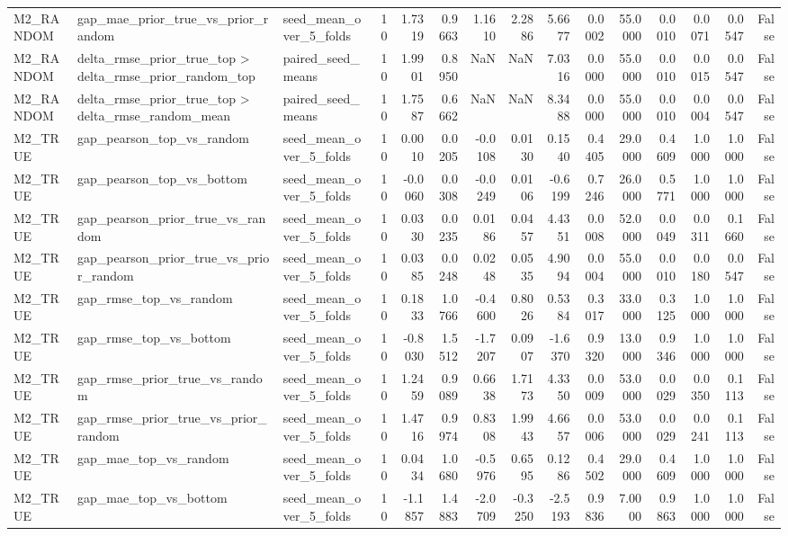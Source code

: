 \begin{tabular}{lllrrrrrrrrrrrr}
M2_RANDOM & gap_mae_prior_true_vs_prior_random & seed_mean_over_5_folds & 10 & 1.7319 & 0.9663 & 1.1610 & 2.2886 & 5.6677 & 0.0002 & 55.0000 & 0.0010 & 0.0071 & 0.0547 & False \\
M2_RANDOM & delta_rmse_prior_true_top > delta_rmse_prior_random_top & paired_seed_means & 10 & 1.9901 & 0.8950 & NaN & NaN & 7.0316 & 0.0000 & 55.0000 & 0.0010 & 0.0015 & 0.0547 & False \\
M2_RANDOM & delta_rmse_prior_true_top > delta_rmse_random_mean & paired_seed_means & 10 & 1.7587 & 0.6662 & NaN & NaN & 8.3488 & 0.0000 & 55.0000 & 0.0010 & 0.0004 & 0.0547 & False \\
M2_TRUE & gap_pearson_top_vs_random & seed_mean_over_5_folds & 10 & 0.0010 & 0.0205 & -0.0108 & 0.0130 & 0.1540 & 0.4405 & 29.0000 & 0.4609 & 1.0000 & 1.0000 & False \\
M2_TRUE & gap_pearson_top_vs_bottom & seed_mean_over_5_folds & 10 & -0.0060 & 0.0308 & -0.0249 & 0.0106 & -0.6199 & 0.7246 & 26.0000 & 0.5771 & 1.0000 & 1.0000 & False \\
M2_TRUE & gap_pearson_prior_true_vs_random & seed_mean_over_5_folds & 10 & 0.0330 & 0.0235 & 0.0186 & 0.0457 & 4.4351 & 0.0008 & 52.0000 & 0.0049 & 0.0311 & 0.1660 & False \\
M2_TRUE & gap_pearson_prior_true_vs_prior_random & seed_mean_over_5_folds & 10 & 0.0385 & 0.0248 & 0.0248 & 0.0535 & 4.9094 & 0.0004 & 55.0000 & 0.0010 & 0.0180 & 0.0547 & False \\
M2_TRUE & gap_rmse_top_vs_random & seed_mean_over_5_folds & 10 & 0.1833 & 1.0766 & -0.4600 & 0.8026 & 0.5384 & 0.3017 & 33.0000 & 0.3125 & 1.0000 & 1.0000 & False \\
M2_TRUE & gap_rmse_top_vs_bottom & seed_mean_over_5_folds & 10 & -0.8030 & 1.5512 & -1.7207 & 0.0907 & -1.6370 & 0.9320 & 13.0000 & 0.9346 & 1.0000 & 1.0000 & False \\
M2_TRUE & gap_rmse_prior_true_vs_random & seed_mean_over_5_folds & 10 & 1.2459 & 0.9089 & 0.6638 & 1.7173 & 4.3350 & 0.0009 & 53.0000 & 0.0029 & 0.0350 & 0.1113 & False \\
M2_TRUE & gap_rmse_prior_true_vs_prior_random & seed_mean_over_5_folds & 10 & 1.4716 & 0.9974 & 0.8308 & 1.9943 & 4.6657 & 0.0006 & 53.0000 & 0.0029 & 0.0241 & 0.1113 & False \\
M2_TRUE & gap_mae_top_vs_random & seed_mean_over_5_folds & 10 & 0.0434 & 1.0680 & -0.5976 & 0.6595 & 0.1286 & 0.4502 & 29.0000 & 0.4609 & 1.0000 & 1.0000 & False \\
M2_TRUE & gap_mae_top_vs_bottom & seed_mean_over_5_folds & 10 & -1.1857 & 1.4883 & -2.0709 & -0.3250 & -2.5193 & 0.9836 & 7.0000 & 0.9863 & 1.0000 & 1.0000 & False \\

\end{tabular}
